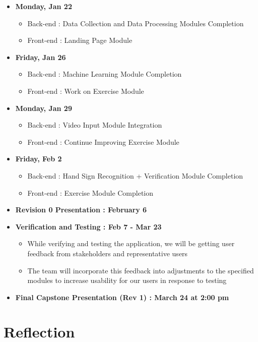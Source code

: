 \documentclass[12pt, titlepage]{article}
\begin{document}
\begin{itemize}
    \item \textbf{Monday, Jan 22}
    \begin{itemize}
        \item Back-end  : Data Collection and Data Processing Modules Completion
        \item Front-end : Landing Page Module
    \end{itemize}
    \item \textbf{Friday, Jan 26}
    \begin{itemize}
        \item Back-end  : Machine Learning Module Completion
        \item Front-end : Work on Exercise Module
    \end{itemize}
    \item \textbf{Monday, Jan 29}
    \begin{itemize}
        \item Back-end  : Video Input Module Integration
        \item Front-end : Continue Improving Exercise Module
    \end{itemize}
    \item \textbf{Friday, Feb 2}
    \begin{itemize}
        \item Back-end  : Hand Sign Recognition + Verification Module Completion
        \item Front-end : Exercise Module Completion
    \end{itemize}
    \item \textbf{Revision 0 Presentation : February 6}
    \item \textbf{Verification and Testing : Feb 7 - Mar 23}
    \begin{itemize}
        \item While verifying and testing the application, we will be getting user feedback from stakeholders and representative users
        \item The team will incorporate this feedback into adjustments to the specified modules to increase usability for our users in response to testing
    \end{itemize}
    \item \textbf{Final Capstone Presentation (Rev 1) : March 24 at 2:00 pm}
\end{itemize}

\section{Reflection}
\end{document}
